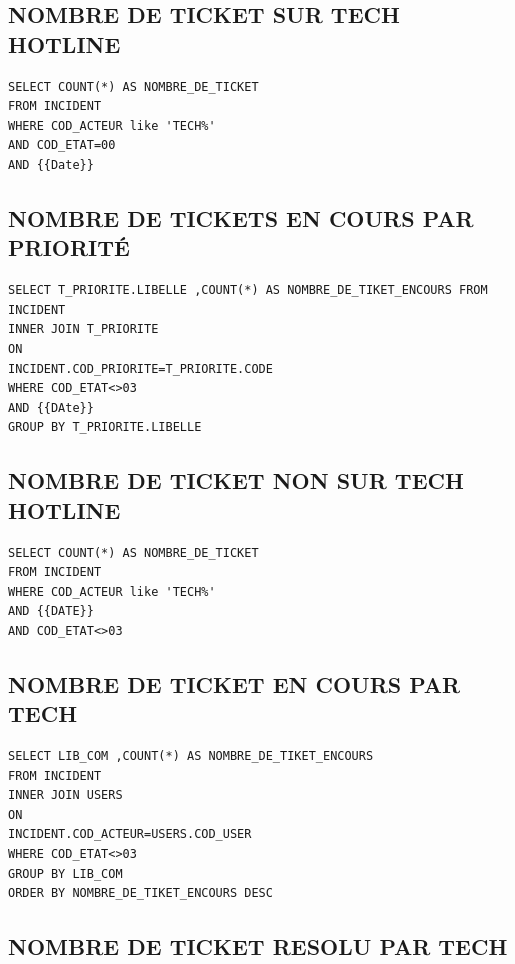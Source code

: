\documentclass[a4paper,12pt]{report}
\begin{document}
\subsection{NOMBRE DE TICKET SUR TECH HOTLINE}
\lstset{
language=SQL,
basicstyle=\footnotesize,
}
\begin{lstlisting}
SELECT COUNT(*) AS NOMBRE_DE_TICKET 
FROM INCIDENT 
WHERE COD_ACTEUR like 'TECH%'
AND COD_ETAT=00
AND {{Date}}
\end{lstlisting}

\subsection{NOMBRE DE TICKETS EN COURS PAR PRIORITÉ} 

\lstset{
language=SQL,
basicstyle=\footnotesize,
}
\begin{lstlisting}
SELECT T_PRIORITE.LIBELLE ,COUNT(*) AS NOMBRE_DE_TIKET_ENCOURS FROM INCIDENT 
INNER JOIN T_PRIORITE
ON 
INCIDENT.COD_PRIORITE=T_PRIORITE.CODE
WHERE COD_ETAT<>03
AND {{DAte}}
GROUP BY T_PRIORITE.LIBELLE
\end{lstlisting}

\subsection{NOMBRE DE TICKET NON SUR TECH HOTLINE} 

\lstset{
language=SQL,
basicstyle=\footnotesize,
}
\begin{lstlisting}
SELECT COUNT(*) AS NOMBRE_DE_TICKET 
FROM INCIDENT 
WHERE COD_ACTEUR like 'TECH%' 
AND {{DATE}}
AND COD_ETAT<>03
\end{lstlisting}



\subsection{NOMBRE DE TICKET EN COURS PAR TECH} 

\lstset{
language=SQL,
basicstyle=\footnotesize,
}
\begin{lstlisting}
SELECT LIB_COM ,COUNT(*) AS NOMBRE_DE_TIKET_ENCOURS 
FROM INCIDENT 
INNER JOIN USERS
ON 
INCIDENT.COD_ACTEUR=USERS.COD_USER
WHERE COD_ETAT<>03
GROUP BY LIB_COM
ORDER BY NOMBRE_DE_TIKET_ENCOURS DESC
\end{lstlisting}


\subsection{NOMBRE DE TICKET RESOLU PAR TECH} 
\end{document}
